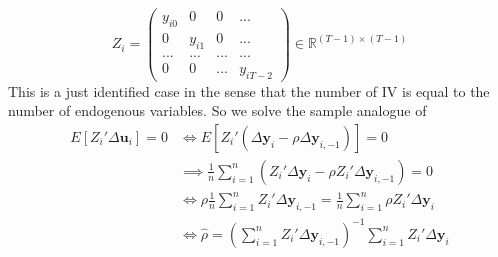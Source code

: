 \[
Z_i = \begin{pmatrix}y_{i0}& 0 & 0 & ... \\ 0 & y_{i1}& 0 & ... \\ ... & ... &...&...\\ 0 & 0 & ... & y_{iT-2} \end{pmatrix}\in\mathbb{R}^{(T-1)\times (T-1)}
\]
This is a just identified case in the sense that the number of IV is equal to the number of endogenous variables. So we solve the sample analogue of
\begin{align*}
E[Z_i'\Delta \mathbf{u}_i]=0&\iff E[Z_i'(\Delta \mathbf{y}_i - \rho\Delta\mathbf{y}_{i,-1})]=0\\
&\implies \frac{1}{n}\sum_{i=1}^n(Z_i'\Delta \mathbf{y}_i - \rho Z_i'\Delta \mathbf{y}_{i,-1})=0\\
&\iff \rho \frac{1}{n}\sum_{i=1}^n  Z_i'\Delta \mathbf{y}_{i,-1}=  \frac{1}{n}\sum_{i=1}^n \rho Z_i'\Delta \mathbf{y}_{i}\\
&\iff \hat{\rho}=\left(\sum_{i=1}^n  Z_i'\Delta \mathbf{y}_{i,-1}\right)^{-1}\sum_{i=1}^n  Z_i'\Delta \mathbf{y}_{i}
\end{align*} 
